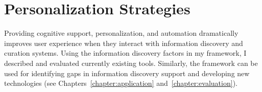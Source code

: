 {\section{Personalization Strategies}
} %

Providing cognitive support, personalization, and automation dramatically improves user experience when they interact with information discovery and curation systems. Using the information discovery factors in my framework, I described and evaluated currently existing tools. Similarly, the framework can be used for identifying gaps in information discovery support and developing new technologies (see Chapters~\ref{chapter:application} and~\ref{chapter:evaluation}).  